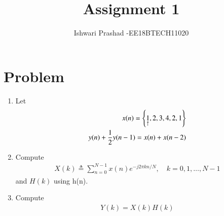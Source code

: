\documentclass[journal,12pt,twocolumn]{IEEEtran}
\renewcommand\thesection{\arabic{section}}
\begin{document}
\def\putbox#1#2#3{\makebox[0in][l]{\makebox[#1][l]{}\raisebox{\baselineskip}[0in][0in]{\raisebox{#2}[0in][0in]{#3}}}}
     \def\rightbox#1{\makebox[0in][r]{#1}}
     \def\centbox#1{\makebox[0in]{#1}}
     \def\topbox#1{\raisebox{-\baselineskip}[0in][0in]{#1}}
     \def\midbox#1{\raisebox{-0.5\baselineskip}[0in][0in]{#1}}
\vspace{3cm}
\title{Assignment 1}
\author{Ishwari Prashad -EE18BTECH11020}
\maketitle
\newpage
\bigskip
\renewcommand{\thefigure}{\theenumi}
\renewcommand{\thetable}{\theenumi}



\section{Problem}
\begin{enumerate}[label=\thesection.\arabic*.,ref=\thesection.\theenumi]
    
    \item Let
    \begin{align}
        x(n) = \cbrak{\underset{\uparrow}{1},2,3,4,2,1}
         \label{eq:equation0}\\
        y(n) + \frac{1}{2}y(n-1) = x(n) + x(n-2)	
        \label{eq:equation1}
    \end{align}
    
    \item Compute 
    \begin{align}
        X(k) \triangleq \sum_{n=0}^{N-1} x(n) e^{-j 2 \pi k n / N}, \quad k=0,1, \ldots, N-1
    \end{align}
    and $H(k)$ using h(n).
    
    \item Compute 
    \begin{align}
    Y(k) = X(k)H(k)
    \end{align}
\end{enumerate}
\end{document}
